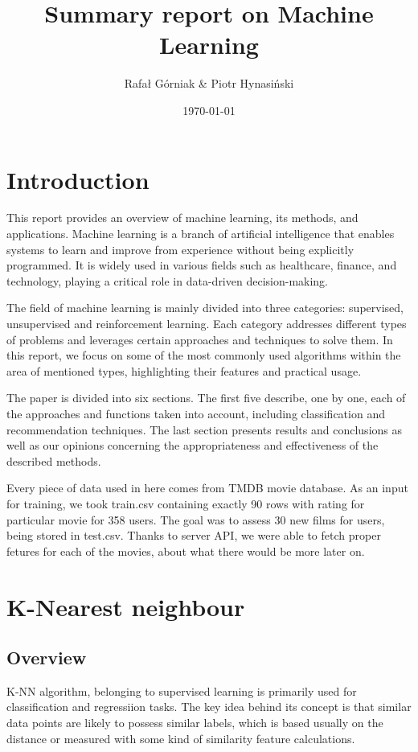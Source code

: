 \documentclass{article}
\title{Summary report on Machine Learning}
\author{Rafał Górniak \& Piotr Hynasiński}
\date{\today}
\begin{document}
\maketitle

\vspace{1cm}

\section{Introduction}

This report provides an overview of machine learning, its methods, and applications. 
Machine learning is a branch of artificial intelligence that enables systems to learn and improve from experience 
without being explicitly programmed. It is widely used in various fields such as healthcare, finance, and technology, 
playing a critical role in data-driven decision-making.

The field of machine learning is mainly divided into three categories: supervised, unsupervised and reinforcement learning. 
Each category addresses different types of problems and leverages certain approaches and techniques to solve them. 
In this report, we focus on some of the most commonly used algorithms within the area of mentioned types, 
highlighting their features and practical usage.

The paper is divided into six sections. The first five describe, one by one, each of the approaches and functions 
taken into account, including classification and recommendation techniques. The last section presents results and 
conclusions as well as our opinions concerning the appropriateness and effectiveness of the described methods.

Every piece of data used in here comes from TMDB movie database. As an input for training, we took train.csv containing exactly 
90 rows with rating for particular movie for 358 users. The goal was to assess 30 new films for users, being stored in test.csv.
Thanks to server API, we were able to fetch proper fetures for each of the movies, about what there would be more later on. 

\newpage
\section{K-Nearest neighbour}
\subsection{Overview}
K-NN algorithm, belonging to supervised learning is primarily used for classification and regressiion tasks.
The key idea behind its concept is that similar data points are likely to possess similar labels, which is based usually on
the distance or measured with some kind of similarity feature calculations.
\end{document}
